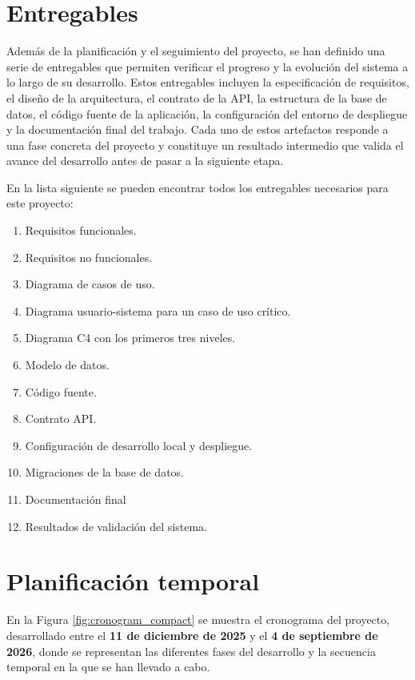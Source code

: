\section{Entregables}
Además de la planificación y el seguimiento del proyecto, se han definido una serie de entregables que permiten verificar el progreso y la evolución del sistema a lo largo de su desarrollo. Estos entregables incluyen la especificación de requisitos, el diseño de la arquitectura, el contrato de la API, la estructura de la base de datos, el código fuente de la aplicación, la configuración del entorno de despliegue y la documentación final del trabajo. Cada uno de estos artefactos responde a una fase concreta del proyecto y constituye un resultado intermedio que valida el avance del desarrollo antes de pasar a la siguiente etapa.

En la lista siguiente se pueden encontrar todos los entregables necesarios para este proyecto:

\begin{enumerate}
    \item Requisitos funcionales.
    \item Requisitos no funcionales. 
    \item Diagrama de casos de uso. 
    \item Diagrama usuario-sistema para un caso de uso crítico.
    \item Diagrama C4 con los primeros tres niveles.
    \item Modelo de datos.
    \item Código fuente.
    \item Contrato API.
    \item Configuración de desarrollo local y despliegue.
    \item Migraciones de la base de datos.
    \item Documentación final
    \item Resultados de validación del sistema.
\end{enumerate}

\section{Planificación temporal}
En la Figura \ref{fig:cronogram_compact} se muestra el cronograma del proyecto, desarrollado entre el \textbf{11 de diciembre de 2025} y el \textbf{4 de septiembre de 2026}, donde se representan las diferentes fases del desarrollo y la secuencia temporal en la que se han llevado a cabo.

